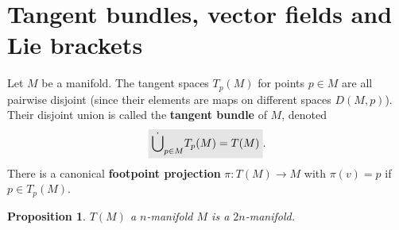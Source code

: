 \documentclass[letter-paper]{tufte-book}
\newtheorem{proposition}[theorem]{\color{pastel-blue}Proposition}
\newcommand{\highlight}[1]{\mathchoice%
  {\colorbox{black!10}{$\displaystyle#1$}}%
  {\colorbox{black!10}{$\textstyle#1$}}%
  {\colorbox{black!10}{$\scriptstyle#1$}}%
  {\colorbox{black!10}{$\scriptscriptstyle#1$}}}%
\begin{document}

\section{Tangent bundles, vector fields and Lie brackets}

Let $M$ be a manifold. The tangent spaces $T_p(M)$ for points $p\in M$ are all pairwise disjoint (since their elements are maps on different spaces $D(M,p)$). Their disjoint union is called the \textbf{tangent bundle} of $M$, denoted
\begin{equation}
  \highlight{\dot{\bigcup}_{p\in M} T_p(M) = T(M)}.
\end{equation}
There is a canonical \textbf{footpoint projection} $\pi: T(M) \to M$ with $\pi(v) = p$ if $p\in T_p(M)$.

\begin{proposition}
  $T(M)$ a $n$-manifold $M$ is a $2n$-manifold.
\end{proposition}
\end{document}
